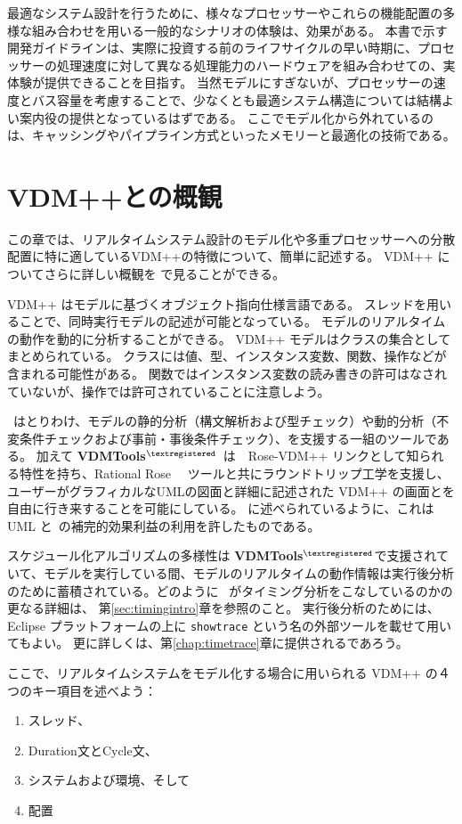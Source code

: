 \documentclass[\pformat,12pt]{jreport}
\newcommand{\vdmtools}{\textbf{VDMTools}$^{\mathbf{{\textregistered}}}$}
\begin{document}
最適なシステム設計を行うために、様々なプロセッサーやこれらの機能配置の多様な組み合わせを用いる一般的なシナリオの体験は、効果がある。
本書で示す開発ガイドラインは、実際に投資する前のライフサイクルの早い時期に、プロセッサーの処理速度に対して異なる処理能力のハードウェアを組み合わせての、実体験が提供できることを目指す。
当然モデルにすぎないが、プロセッサーの速度とバス容量を考慮することで、少なくとも最適システム構造については結構よい案内役の提供となっているはずである。
ここでモデル化から外れているのは、キャッシングやパイプライン方式といったメモリーと最適化の技術である。

\section{VDM++と\VDMTools の概観}

この章では、リアルタイムシステム設計のモデル化や多重プロセッサーへの分散配置に特に適しているVDM++の特徴について、簡単に記述する。
VDM++ についてさらに詳しい概観を \cite{LangManPP,UserManPP}で見ることができる。


VDM++ はモデルに基づくオブジェクト指向仕様言語である。
スレッドを用いることで、同時実行モデルの記述が可能となっている。
モデルのリアルタイムの動作を動的に分析することができる。
VDM++ モデルはクラスの集合としてまとめられている。
クラスには値、型、インスタンス変数、関数、操作などが含まれる可能性がある。
関数ではインスタンス変数の読み書きの許可はなされていないが、操作では許可されていることに注意しよう。

\VDMTools\ はとりわけ、モデルの静的分析（構文解析および型チェック）や動的分析（不変条件チェックおよび事前・事後条件チェック）、を支援する一組のツールである。
加えて \vdmtools\ は　Rose-VDM++ リンクとして知られる特性を持ち、Rational Rose
\cite{Rose&00}　ツールと共にラウンドトリップ工学を支援し、ユーザーがグラフィカルなUMLの図面と詳細に記述された VDM++ の画面とを自由に行き来することを可能にしている。
\cite{Guidelines}に述べられているように、これは UML と\VDMTools\ の補完的効果利益の利用を許したものである。

スケジュール化アルゴリズムの多様性は \vdmtools で支援されていて、モデルを実行している間、モデルのリアルタイムの動作情報は実行後分析のために蓄積されている。どのように \VDMTools\ がタイミング分析をこなしているのかの更なる詳細は、
第\ref{sec:timingintro}章を参照のこと。
実行後分析のためには、 Eclipse プラットフォームの上に \texttt{showtrace} という名の外部ツールを載せて用いてもよい。
更に詳しくは、第\ref{chap:timetrace}章に提供されるであろう。

ここで、リアルタイムシステムをモデル化する場合に用いられる VDM++ の４つのキー項目を述べよう：
\begin{enumerate}
\item スレッド、
\item Duration文とCycle文、
\item システムおよび環境、そして
\item 配置
\end{enumerate}
\end{document}
